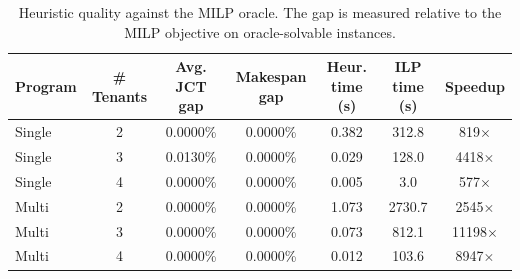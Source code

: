 \begin{table}[t]
\centering
\caption{Heuristic quality against the MILP oracle. The gap is measured relative to the MILP objective on oracle-solvable instances.}
\label{tab:ilp-oracle-validation}
\begin{tabular}{lcccccc}
\toprule
Program & \# Tenants & Avg. JCT gap & Makespan gap & Heur. time (s) & ILP time (s) & Speedup \\
\midrule
Single & 2 & 0.0000\% & 0.0000\% & 0.382 & 312.8 & 819$\times$ \\
Single & 3 & 0.0130\% & 0.0000\% & 0.029 & 128.0 & 4418$\times$ \\
Single & 4 & 0.0000\% & 0.0000\% & 0.005 & 3.0 & 577$\times$ \\
Multi & 2 & 0.0000\% & 0.0000\% & 1.073 & 2730.7 & 2545$\times$ \\
Multi & 3 & 0.0000\% & 0.0000\% & 0.073 & 812.1 & 11198$\times$ \\
Multi & 4 & 0.0000\% & 0.0000\% & 0.012 & 103.6 & 8947$\times$ \\
\bottomrule
\end{tabular}
\end{table}
